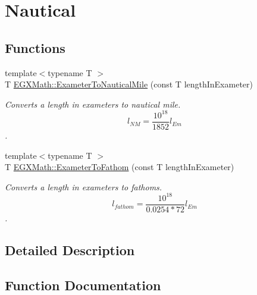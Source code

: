 \hypertarget{group___e_g_x_math-_conversions-_length_conversions-_s_i-_exameter-_nautical}{}\section{Nautical}
\label{group___e_g_x_math-_conversions-_length_conversions-_s_i-_exameter-_nautical}
\subsection*{Functions}
\begin{DoxyCompactItemize}
\item 
{\footnotesize template$<$typename T $>$ }\\T \mbox{\hyperlink{group___e_g_x_math-_conversions-_length_conversions-_s_i-_exameter-_nautical_gaf593ae9d78bd889caca4e9249be1464a}{E\+G\+X\+Math\+::\+Exameter\+To\+Nautical\+Mile}} (const T length\+In\+Exameter)
\begin{DoxyCompactList}\small\item\em Converts a length in exameters to nautical mile. \[ l_{NM}= \frac{10^{18}}{1852} l_{Em} \]. \end{DoxyCompactList}\item 
{\footnotesize template$<$typename T $>$ }\\T \mbox{\hyperlink{group___e_g_x_math-_conversions-_length_conversions-_s_i-_exameter-_nautical_gab6f73111fd59a46fb28473d73ddb6033}{E\+G\+X\+Math\+::\+Exameter\+To\+Fathom}} (const T length\+In\+Exameter)
\begin{DoxyCompactList}\small\item\em Converts a length in exameters to fathoms. \[ l_{fathom}= \frac{10^{18}}{0.0254 * 72} l_{Em} \]. \end{DoxyCompactList}\end{DoxyCompactItemize}


\subsection{Detailed Description}


\subsection{Function Documentation}
\mbox{\label{group___e_g_x_math-_conversions-_length_conversions-_s_i-_exameter-_nautical_gab6f73111fd59a46fb28473d73ddb6033}} 
